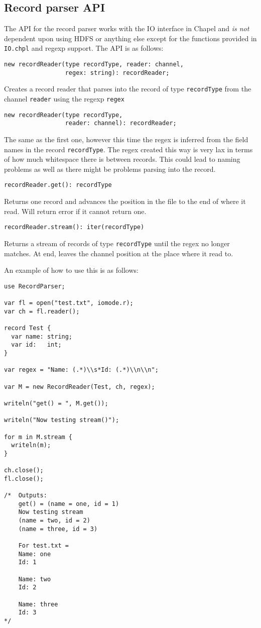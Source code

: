 \subsection{Record parser API}
The API for the record parser works with the IO interface in Chapel and
\emph{is not} dependent upon using HDFS or anything else except for the
functions provided in {\tt IO.chpl} and regexp support. The API is as follows:
\begin{lstlisting}
new recordReader(type recordType, reader: channel, 
                 regex: string): recordReader;
\end{lstlisting}
Creates a record reader that parses into the record of type {\tt recordType}
from the channel {\tt reader} using the regexp {\tt regex}
\begin{lstlisting}
new recordReader(type recordType, 
                 reader: channel): recordReader;
\end{lstlisting}
The same as the first one, however this time the regex is inferred from the
field names in the record {\tt recordType}. The regex created this way is very
lax in terms of how much whitespace there is between records. This could lead to naming problems as
well as there might be problems parsing into the record. 

\begin{lstlisting}
recordReader.get(): recordType
\end{lstlisting}
Returns one record and advances the position in the file to the end of
where it read. Will return error if it cannot return one.

\begin{lstlisting}
recordReader.stream(): iter(recordType)
\end{lstlisting}
Returns a stream of records of type {\tt recordType} until the regex no longer
matches. At end, leaves the channel position at the place where it read to.  

An example of how to use this is as follows:
\begin{lstlisting}
use RecordParser;

var fl = open("test.txt", iomode.r);
var ch = fl.reader();

record Test {
  var name: string;
  var id:   int;
}

var regex = "Name: (.*)\\s*Id: (.*)\\n\\n";

var M = new RecordReader(Test, ch, regex);

writeln("get() = ", M.get());

writeln("Now testing stream()");

for m in M.stream {
  writeln(m);
}

ch.close();
fl.close();

/*  Outputs: 
    get() = (name = one, id = 1)
    Now testing stream
    (name = two, id = 2)
    (name = three, id = 3)

    For test.txt = 
    Name: one
    Id: 1

    Name: two
    Id: 2

    Name: three
    Id: 3
*/
\end{lstlisting}

